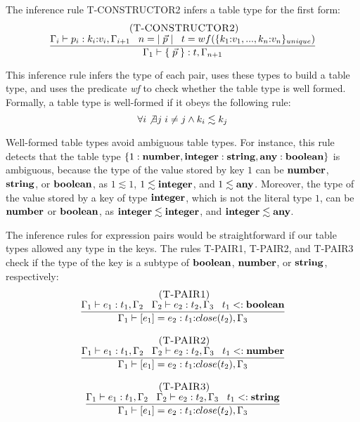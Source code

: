 The inference rule \textsc{T-CONSTRUCTOR2} infers a table type for
the first form:
\[
\begin{array}{c}
\; (\textsc{T-CONSTRUCTOR2})\\
\dfrac{\Gamma_{i} \vdash p_{i}:k_{i}{:}v_{i}, \Gamma_{i+1} \;\;\;
       n = |\;\vec{p}\;| \;\;\;
       t = wf(\{k_{1}{:}v_{1}, ..., k_{n}{:}v_{n}\}_{unique})}
      {\Gamma_{1} \vdash \{\;\vec{p}\;\}:t, \Gamma_{n+1}}
\end{array}
\]

This inference rule infers the type of each pair, uses these types
to build a table type, and uses the predicate \emph{wf} to check
whether the table type is well formed.
Formally, a table type is well-formed if it obeys the following rule:
\[
\forall i \not\exists j \; i \not= j \wedge k_{i} \lesssim k_{j}
\]

Well-formed table types avoid ambiguous table types.
For instance, this rule detects that the table type
$\{1:\mathbf{number}, \mathbf{integer}:\mathbf{string}, \mathbf{any}:\mathbf{boolean}\}$ is ambiguous,
because the type of the value stored by key $1$ can be
$\mathbf{number}$, $\mathbf{string}$, or $\mathbf{boolean}$, as $1 \lesssim 1$,
$1 \lesssim \mathbf{integer}$, and $1 \lesssim \mathbf{any}$.
Moreover, the type of the value stored by a key of type $\mathbf{integer}$,
which is not the literal type $1$, can be $\mathbf{number}$ or $\mathbf{boolean}$,
as $\mathbf{integer} \lesssim \mathbf{integer}$, and $\mathbf{integer} \lesssim \mathbf{any}$.

The inference rules for expression pairs would be straightforward
if our table types allowed any type in the keys.
The rules \textsc{T-PAIR1}, \textsc{T-PAIR2}, and \textsc{T-PAIR3}
check if the type of the key is a subtype of $\mathbf{boolean}$, $\mathbf{number}$,
or $\mathbf{string}$, respectively:
\[
\begin{array}{c}
\begin{array}{c}
\; (\textsc{T-PAIR1})\\
\dfrac{\Gamma_{1} \vdash e_{1}:t_{1}, \Gamma_{2} \;\;\;
       \Gamma_{2} \vdash e_{2}:t_{2}, \Gamma_{3} \;\;\;
       t_{1} <: \mathbf{boolean}}
      {\Gamma_{1} \vdash [e_{1}] = e_{2}: t_{1}{:}close(t_{2}), \Gamma_{3}}
\end{array}
\\ \\
\begin{array}{c}
\; (\textsc{T-PAIR2})\\
\dfrac{\Gamma_{1} \vdash e_{1}:t_{1}, \Gamma_{2} \;\;\;
       \Gamma_{2} \vdash e_{2}:t_{2}, \Gamma_{3} \;\;\;
       t_{1} <: \mathbf{number}}
      {\Gamma_{1} \vdash [e_{1}] = e_{2}: t_{1}{:}close(t_{2}), \Gamma_{3}}
\end{array}
\\ \\
\begin{array}{c}
\; (\textsc{T-PAIR3})\\
\dfrac{\Gamma_{1} \vdash e_{1}:t_{1}, \Gamma_{2} \;\;\;
       \Gamma_{2} \vdash e_{2}:t_{2}, \Gamma_{3} \;\;\;
       t_{1} <: \mathbf{string}}
      {\Gamma_{1} \vdash [e_{1}] = e_{2}: t_{1}{:}close(t_{2}), \Gamma_{3}}
\end{array}
\end{array}
\]

